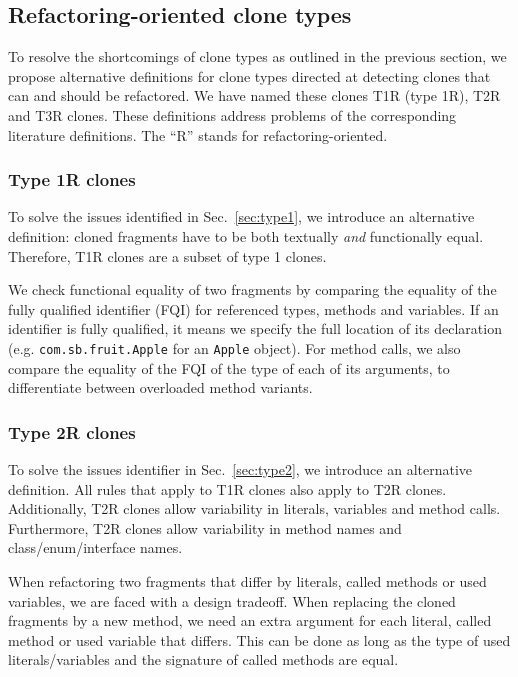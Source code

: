 \documentclass[a4paper]{article}
\begin{document}
\subsection{Refactoring-oriented clone types}\label{sec:rtypes}
To resolve the shortcomings of clone types as outlined in the previous section, we propose alternative definitions for clone types directed at detecting clones that can and should be refactored. We have named these clones T1R (type 1R), T2R and T3R clones. These definitions address problems of the corresponding literature definitions. The ``R'' stands for refactoring-oriented.

\subsubsection{Type 1R clones} \label{sec:type1r}
To solve the issues identified in Sec.~\ref{sec:type1}, we introduce an alternative definition: cloned fragments have to be both textually \textit{and} functionally equal. Therefore, T1R clones are a subset of type 1 clones.

We check functional equality of two fragments by comparing the equality of the fully qualified identifier (FQI) for referenced types, methods and variables. If an identifier is fully qualified, it means we specify the full location of its declaration (e.g. \texttt{com.sb.fruit.Apple} for an \texttt{Apple} object). For method calls, we also compare the equality of the FQI of the type of each of its arguments, to differentiate between overloaded method variants.

\subsubsection{Type 2R clones}\label{sec:type2r}
To solve the issues identifier in Sec.~\ref{sec:type2}, we introduce an alternative definition. All rules that apply to T1R clones also apply to T2R clones. Additionally, T2R clones allow variability in literals, variables and method calls. Furthermore, T2R clones allow variability in method names and class/enum/interface names.

When refactoring two fragments that differ by literals, called methods or used variables, we are faced with a design tradeoff. When replacing the cloned fragments by a new method, we need an extra argument for each literal, called method or used variable that differs. This can be done as long as the type of used literals/variables and the signature of called methods are equal.
\end{document}
